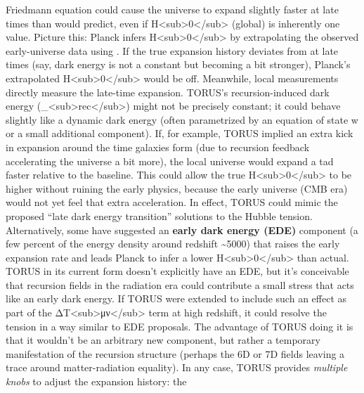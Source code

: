 \documentclass[
]{article}
\begin{document}
\begin{enumerate}
  Friedmann equation could cause the universe to expand slightly faster
  at late times than \LambdaCDM would predict, even if
  H\textless sub\textgreater0\textless/sub\textgreater{} (global) is
  inherently one value. Picture this: Planck infers
  H\textless sub\textgreater0\textless/sub\textgreater{} by
  extrapolating the observed early-universe data using \LambdaCDM. If the true
  expansion history deviates from \LambdaCDM at late times (say, dark energy
  is not a constant but becoming a bit stronger), Planck's extrapolated
  H\textless sub\textgreater0\textless/sub\textgreater{} would be off.
  Meanwhile, local measurements directly measure the late-time
  expansion. TORUS's recursion-induced dark energy
  (\Lambda\_\textless sub\textgreater rec\textless/sub\textgreater) might not
  be precisely constant; it could behave slightly like a dynamic dark
  energy (often parametrized by an equation of state w or a small
  additional component). If, for example, TORUS implied an extra kick in
  expansion around the time galaxies form (due to recursion feedback
  accelerating the universe a bit more), the local universe would expand
  a tad faster relative to the \LambdaCDM baseline. This could allow the true
  H\textless sub\textgreater0\textless/sub\textgreater{} to be higher
  without ruining the early physics, because the early universe (CMB
  era) would not yet feel that extra acceleration. In effect, TORUS
  could mimic the proposed ``late dark energy transition'' solutions to
  the Hubble tension. Alternatively, some have suggested an
  \textbf{early dark energy (EDE)} component (a few percent of the
  energy density around redshift \textasciitilde5000) that raises the
  early expansion rate and leads Planck to infer a lower
  H\textless sub\textgreater0\textless/sub\textgreater{} than actual.
  TORUS in its current form doesn't explicitly have an EDE, but it's
  conceivable that recursion fields in the radiation era could
  contribute a small stress that acts like an early dark energy. If
  TORUS were extended to include such an effect as part of the
  ΔT\textless sub\textgreater μν\textless/sub\textgreater{} term at high
  redshift, it could resolve the tension in a way similar to EDE
  proposals\hspace{0pt}. The advantage of TORUS doing it is that it
  wouldn't be an arbitrary new component, but rather a temporary
  manifestation of the recursion structure (perhaps the 6D or 7D fields
  leaving a trace around matter-radiation equality). In any case, TORUS
  provides \emph{multiple knobs} to adjust the expansion history: the

\end{enumerate}
\end{document}
